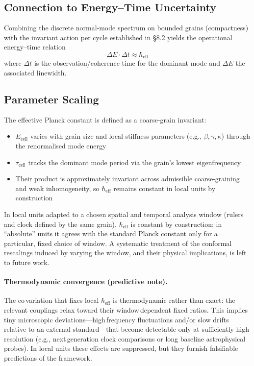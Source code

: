 \documentclass[11pt]{article}
\begin{document}
\subsection{Connection to Energy–Time Uncertainty}

Combining the discrete normal‑mode spectrum on bounded grains (compactness) with the invariant action per cycle established in §8.2 yields the operational energy–time relation
\begin{equation}
\Delta E \cdot \Delta t \approx \hbar_{\mathrm{eff}}
\end{equation}
where $\Delta t$ is the observation/coherence time for the dominant mode and $\Delta E$ the associated linewidth.

\subsection{Parameter Scaling}

The effective Planck constant is defined as a coarse‑grain invariant:
\begin{itemize}
\item $E_{\text{cell}}$ varies with grain size and local stiffness parameters (e.g., $\beta, \gamma, \kappa$) through the renormalised mode energy
\item $\tau_{\text{cell}}$ tracks the dominant mode period via the grain's lowest eigenfrequency
\item Their product is approximately invariant across admissible coarse‑graining and weak inhomogeneity, so $\hbar_{\mathrm{eff}}$ remains constant in local units by construction
\end{itemize}

\noindent In local units adapted to a chosen spatial and temporal analysis window (rulers and clock defined by the same grain), $\hbar_{\mathrm{eff}}$ is constant by construction; in ``absolute'' units it agrees with the standard Planck constant only for a particular, fixed choice of window. A systematic treatment of the conformal rescalings induced by varying the window, and their physical implications, is left to future work.

\paragraph{Thermodynamic convergence (predictive note).} The co\,variation that fixes local $\hbar_{\mathrm{eff}}$ is thermodynamic rather than exact: the relevant couplings relax toward their window\,dependent fixed ratios. This implies tiny microscopic deviations---high\,frequency fluctuations and/or slow drifts relative to an external standard---that become detectable only at sufficiently high resolution (e.g., next\,generation clock comparisons or long baseline astrophysical probes). In local units these effects are suppressed, but they furnish falsifiable predictions of the framework.
\end{document}

